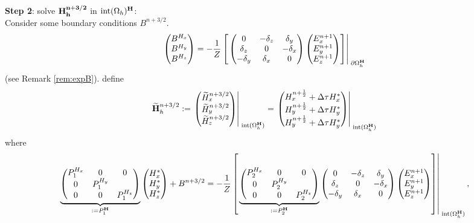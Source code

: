 \documentclass[12pt,reqno]{amsart}
\newcommand{\h}{{\bf H}}
\theoremstyle{definition}
\numberwithin{equation}{section}
\newcommand{\intr}[1]{\mathrm{int}(#1)}
\def\Gwh{\Omega_h}
\begin{document}
	\\[2mm]
	{\bf Step 2}: solve $\bf{H}^{n+3/2}_h$ in $\intr\Gwh^\h$: \\[2mm]
	Consider some  boundary conditions $B^{n+3/2}$.
	\begin{equation}\label{eq:BH}
	\begin{pmatrix}
		B^{H_x}\\ B^{H_y}\\ B^{H_z}
	\end{pmatrix}
	=
	-\frac{1}{Z}
	\left[ \left.	
	\begin{pmatrix}
		0& -\delta_z & \delta _y\\
		\delta_z&0&-\delta_x\\
		-\delta_y&\delta_x&0\\
	\end{pmatrix}
	\begin{pmatrix}
		E_x^{n+1}\\
		E_y^{n+1}\\
		E_z^{n+1}
	\end{pmatrix}\right]\right|_{\; \partial{\Gwh^{\h}}}^{\;}
	\end{equation}
	(see Remark \ref{rem:expB}).
define
	$$
	\widetilde{\h}_h^{n+3/2}:=
	\left.
	\begin{pmatrix}
		\widetilde{H}_x^{n+3/2}\\
		\widetilde{H}_y^{n+3/2}\\
		\widetilde{H}_z^{n+3/2}
	\end{pmatrix}\right|_{\; \intr{\Gwh^{\h}}}^{\;}=
\left.
	\begin{pmatrix}
		H_x^{n+\frac{1}{2}}+\Delta \tau H_x^{*}\\
		H_y^{n+\frac{1}{2}}+\Delta \tau H_y^{*}\\
		H_y^{n+\frac{1}{2}}+\Delta \tau H_y^{*}
	\end{pmatrix}\right|_{\; \intr{\Gwh^{\h}}}^{\;}
	$$
	where 
	$$
	\underbrace{
	\begin{pmatrix}
		P_1^{H_x}  & 0&0 \\
		0 & 	P_1^{H_y}  &\\
		0&0&	P_1^{H_z} 
	\end{pmatrix}
}_{:=P_1^\h}
	\begin{pmatrix}
		H_x^{*}\\
		H_y^{*} \\
		H_z^{*}
	\end{pmatrix}+B^{n+3/2}=-\frac{1}{Z}
\left[ \left.
	\underbrace{
	\begin{pmatrix}
		P_2^{H_x} & 0&0 \\
		0 & P_2^{H_y} &\\
		0&0&P_2^{H_z} 
	\end{pmatrix}
}_{:=P_2^\h}
	\begin{pmatrix}
		0& -\delta_z & \delta _y\\
		\delta_z&0&-\delta_x\\
		-\delta_y&\delta_x&0\\
	\end{pmatrix}
	\begin{pmatrix}
		E_x^{n+1}\\
		E_y^{n+1}\\
		E_z^{n+1}
	\end{pmatrix}\right]\right|_{\; \intr{\Gwh^{\h}}}^{\;},
	$$
\end{document}
